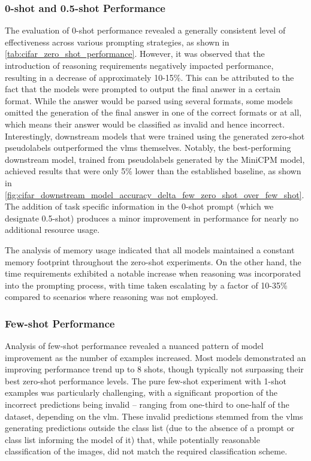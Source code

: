 \documentclass[../ShajiS_RnDReport.tex]{subfiles}
\begin{document}
\subsubsection{0-shot and 0.5-shot Performance}
The evaluation of 0-shot performance revealed a generally consistent level of effectiveness across various prompting strategies, as shown in \autoref{tab:cifar_zero_shot_performance}. However, it was observed that the introduction of reasoning requirements negatively impacted performance, resulting in a decrease of approximately 10-15\%. This can be attributed to the fact that the models were prompted to output the final answer in a certain format. While the answer would be parsed using several formats, some models omitted the generation of the final answer in one of the correct formats or at all, which means their answer would be classified as invalid and hence incorrect. Interestingly, downstream models that were trained using the generated zero-shot pseudolabels outperformed the \glspl{vlm} themselves. Notably, the best-performing downstream model, trained from pseudolabels generated by the MiniCPM model, achieved results that were only 5\% lower than the established baseline, as shown in \autoref{fig:cifar_downstream_model_accuracy_delta_few_zero_shot_over_few_shot}. The addition of task specific information in the 0-shot prompt (which we designate 0.5-shot) produces a minor improvement in performance for nearly no additional resource usage.



The analysis of memory usage indicated that all models maintained a constant memory footprint throughout the zero-shot experiments. On the other hand, the time requirements exhibited a notable increase when reasoning was incorporated into the prompting process, with time taken escalating by a factor of 10-35\% compared to scenarios where reasoning was not employed.

\subsubsection{Few-shot Performance}
Analysis of few-shot performance revealed a nuanced pattern of model improvement as the number of examples increased. Most models demonstrated an improving performance trend up to 8 shots, though typically not surpassing their best zero-shot performance levels. The pure few-shot experiment with 1-shot examples was particularly challenging, with a significant proportion of the incorrect predictions being invalid -- ranging from one-third to one-half of the dataset, depending on the \gls{vlm}. These invalid predictions stemmed from the \glspl{vlm} generating predictions outside the class list (due to the absence of a prompt or class list informing the model of it) that, while potentially reasonable classification of the images, did not match the required classification scheme.
\end{document}
